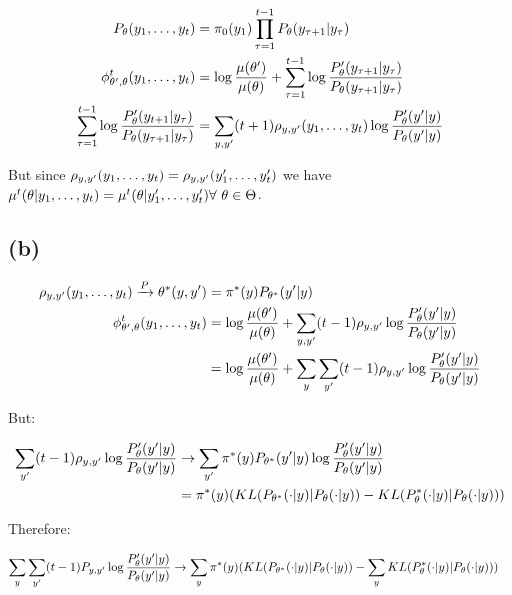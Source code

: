 \documentclass{article}
\begin{document}
\begin{equation}
\begin{split}
  P_\theta(y_1, \ldots, y_t)     & = \pi_0(y_1) \prod_{\tau = 1}^{t-1} P_\theta(y_{\tau+1} |y_\tau) \\
  \phi_{\theta', \theta}^t(y_1, \ldots, y_t)     & = \log \frac{\mu(\theta')}{\mu(\theta)} + \sum_{\tau = 1}^{t-1}
                       \log \frac{P_\theta'(y_{\tau+1}|y_\tau)}{P_\theta(y_{\tau+1}|y_\tau)} \\
   \sum_{\tau = 1}^{t-1} \log \frac{P_\theta'(y_{t+1}|y_\tau)}{P_\theta(y_{\tau+1}|y_\tau)} & =
                       \sum_{y, y'} (t+1) \rho_{y, y'}(y_1, \ldots, y_t)
                       \log \frac{P_\theta'(y'|y)}{P_\theta(y'|y)}
\end{split}
\end{equation}

But since $\rho_{y, y'}(y_1, \ldots, y_t) = \rho_{y, y'}(y_1', \ldots, y_t')$ we
have $\mu^t(\theta| y_1, \ldots, y_t) = \mu^t(\theta | y_1', \ldots, y_t') 
\forall\ \theta \in \Theta$.

\subsection{(b)} %

\begin{equation}
\begin{split}
  \rho_{y,y'}(y_1, \ldots, y_t) \xrightarrow{P} \theta^*(y, y') & =
                     \pi^*(y) P_{\theta^*}(y'|y) \\
  \phi_{\theta', \theta}^t(y_1, \ldots, y_t) & = \log \frac{\mu(\theta')}{\mu(\theta)} +
      \sum_{y, y'}(t-1) \rho_{y, y'} \log \frac{P_\theta'(y'|y)}{P_\theta(y'|y)} \\
               & = \log \frac{\mu(\theta')}{\mu(\theta)} +
      \sum_y \sum_{y'}(t-1) \rho_{y, y'} \log \frac{P_\theta'(y'|y)}{P_\theta(y'|y)}
\end{split}
\end{equation}

But:

\begin{equation}
\begin{split}
  \sum_{y'}(t-1) \rho_{y, y'} \log \frac{P_\theta'(y'|y)}{P_\theta(y'|y)} & \to
  \sum_{y'} \pi^*(y) P_{\theta^*}(y'|y) \log \frac{P_\theta'(y'|y)}{P_\theta(y'|y)} \\
    & = \pi^*(y)(KL(P_{\theta^*}(\cdot | y) | P_\theta(\cdot |y))
           - KL(P_\theta^*(\cdot | y) | P_\theta (\cdot | y)))
\end{split}
\end{equation}

Therefore:

\begin{equation}
\begin{split}
  \sum_y \sum_{y'}(t-1) P_{y, y'} \log \frac{P_\theta'(y'|y)}{P_\theta(y'|y)} & \to
      \sum_y \pi^*(y)(KL(P_{\theta^*}(\cdot | y) | P_\theta(\cdot | y))
        - \sum_y KL(P_\theta^*(\cdot | y) | P_\theta (\cdot | y)))
\end{split}
\end{equation}
\end{document}
